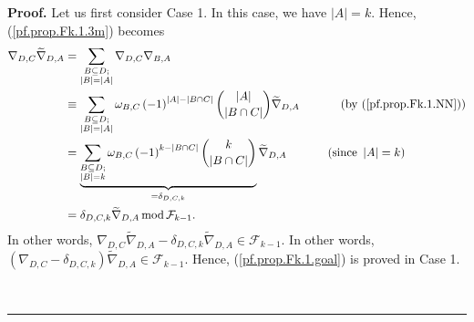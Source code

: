 \documentclass[numbers=enddot,12pt,final,onecolumn,notitlepage]{scrartcl}%
\numberwithin{exer}{subsection}
\theoremstyle{definition}
\newenvironment{proof}[1][Proof]{\noindent\textbf{#1.} }{\ \rule{0.5em}{0.5em}}
\let\sumnonlimits\sum
\renewcommand{\sum}{\sumnonlimits\limits}
\begin{document}
\begin{proof}
Let us first consider Case 1. In this case, we have $\left\vert A\right\vert
=k$. Hence, (\ref{pf.prop.Fk.1.3m}) becomes%
\begin{align*}
\nabla_{D,C}\widetilde{\nabla}_{D,A}  &  =\sum\limits_{\substack{B\subseteq
D;\\\left\vert B\right\vert =\left\vert A\right\vert }}\nabla_{D,C}%
\nabla_{B,A}\\
&  \equiv\sum\limits_{\substack{B\subseteq D;\\\left\vert B\right\vert
=\left\vert A\right\vert }}\omega_{B,C}\left(  -1\right)  ^{\left\vert
A\right\vert -\left\vert B\cap C\right\vert }\dbinom{\left\vert A\right\vert
}{\left\vert B\cap C\right\vert }\widetilde{\nabla}_{D,A}%
\ \ \ \ \ \ \ \ \ \ \left(  \text{by (\ref{pf.prop.Fk.1.NN})}\right) \\
&  =\underbrace{\sum\limits_{\substack{B\subseteq D;\\\left\vert B\right\vert
=k}}\omega_{B,C}\left(  -1\right)  ^{k-\left\vert B\cap C\right\vert }%
\dbinom{k}{\left\vert B\cap C\right\vert }}_{=\delta_{D,C,k}}\widetilde{\nabla
}_{D,A}\ \ \ \ \ \ \ \ \ \ \left(  \text{since }\left\vert A\right\vert
=k\right) \\
&  =\delta_{D,C,k}\widetilde{\nabla}_{D,A}\operatorname{mod}\mathcal{F}_{k-1}.
\end{align*}
In other words, $\nabla_{D,C}\widetilde{\nabla}_{D,A}-\delta_{D,C,k}%
\widetilde{\nabla}_{D,A}\in\mathcal{F}_{k-1}$. In other words, $\left(
\nabla_{D,C}-\delta_{D,C,k}\right)  \widetilde{\nabla}_{D,A}\in\mathcal{F}%
_{k-1}$. Hence, (\ref{pf.prop.Fk.1.goal}) is proved in Case 1.


\end{proof}
\end{document}
